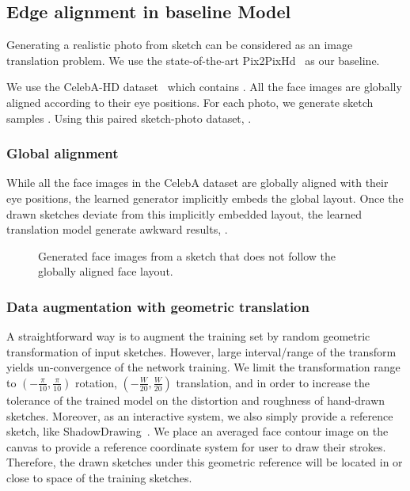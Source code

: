 \subsection{Edge alignment in baseline Model}
\label{subsec:algorithm_baseline}
Generating a realistic photo from sketch can be considered as an image translation problem. 
We use the state-of-the-art Pix2PixHd~\cite{} as our baseline. 
% 
 
We use the CelebA-HD dataset~\cite{} which contains . All the face images are globally aligned according to their eye positions. 
For each photo, we generate sketch samples .
%
Using this paired sketch-photo dataset, .

\subsubsection{Global alignment}
While all the face images in the CelebA dataset \cite{} are globally aligned with their eye positions, the learned generator implicitly embeds the global layout. Once the drawn sketches deviate from this implicitly embedded layout, the learned translation model generate awkward results, . 


\begin{figure}
	\centering
	\vspace{1.0cm}
	\caption{Generated face images from a sketch that does not follow the globally aligned face layout.}
	\label{fig:global-align-fail}
\end{figure}

\subsubsection{Data augmentation with geometric translation}
A straightforward way is to augment the training set by random geometric transformation of input sketches. 
However, large interval/range of the transform yields un-convergence of the network training. 
We limit the transformation range to $(-\frac{\pi}{10},\frac{\pi}{10})$ rotation, $(-\frac{W}{20},\frac{W}{20})$ translation, and  in order to increase the tolerance of the trained model on the distortion and roughness of hand-drawn sketches. 
%
Moreover, as an interactive system, we also simply provide a reference sketch, like ShadowDrawing~\cite{}.
We place an averaged face contour image on the canvas to provide a reference coordinate system for user to draw their strokes. 
Therefore, the drawn sketches under this geometric reference will be located in or close to space of the training sketches.

